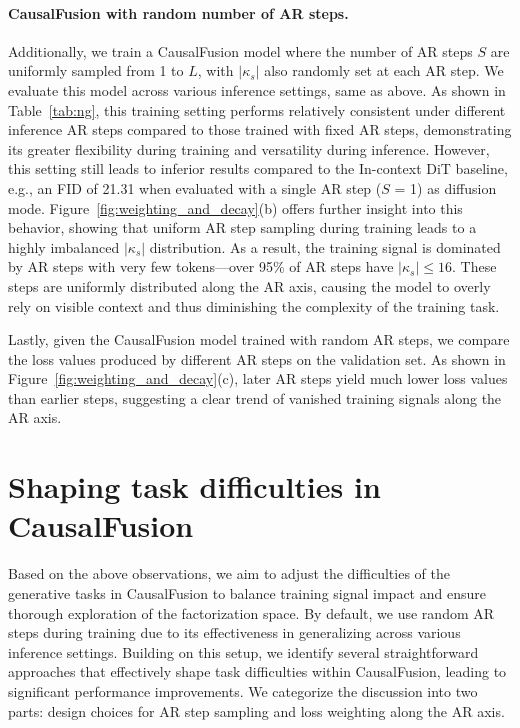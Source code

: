 \paragraph{CausalFusion with random number of AR steps.} 
Additionally, we train a CausalFusion model where the number of AR steps $S$ are uniformly sampled from 1 to $L$, with $|\kappa_s|$ also randomly set at each AR step. We evaluate this model across various inference settings, same as above. As shown in Table~\ref{tab:ng}, this training setting performs relatively consistent under different inference AR steps compared to those trained with fixed AR steps, demonstrating its greater flexibility during training and versatility during inference. However, this setting still leads to inferior results compared to the In-context DiT baseline, e.g., an FID of 21.31 when evaluated with a single AR step ($S$ = 1) as diffusion mode. 
Figure~\ref{fig:weighting_and_decay}(b) offers further insight into this behavior, showing that uniform AR step sampling during training leads to a highly imbalanced $|\kappa_s|$ distribution. As a result, the training signal is dominated by AR steps with very few tokens—over 95\% of AR steps have $|\kappa_s| \leq 16$. These steps are uniformly distributed along the AR axis, causing the model to overly rely on visible context and thus diminishing the complexity of the training task.

Lastly, given the CausalFusion model trained with random AR steps, we compare the loss values produced by different AR steps on the validation set. As shown in Figure~\ref{fig:weighting_and_decay}(c), later AR steps yield much lower loss values than earlier steps, suggesting a clear trend of vanished training signals along the AR axis. 

\section{Shaping task difficulties in CausalFusion} \label{sec:difficulty}
Based on the above observations, we aim to adjust the difficulties of the generative tasks in CausalFusion to balance training signal impact and ensure thorough exploration of the factorization space. By default, we use random AR steps during training due to its effectiveness in generalizing across various inference settings. Building on this setup, we identify several straightforward approaches that effectively shape task difficulties within CausalFusion, leading to significant performance improvements. We categorize the discussion into two parts: design choices for AR step sampling and loss weighting along the AR axis. 

